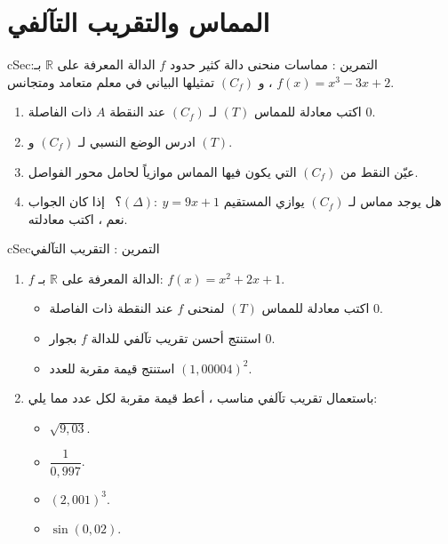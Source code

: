 \documentclass[12pt,a4paper]{article}
\newenvironment{BOX}[2]{\begin{otherlanguage}{english}\begin{arbox}{#1}{#2}}{\end{arbox}\end{otherlanguage}}
\newcounter{exo}
\newenvironment{tamrin}[1]{\stepcounter{exo}\begin{BOX}{cSec}{التمرين \theexo: #1}}{\end{BOX}}
\newcommand{\R}{\mathbb{R}}
\newenvironment{sq}{\begin{itemize}[leftmargin=2.4em,itemsep=3pt]}{\end{itemize}}
\newcommand{\qa}{\item[(أ)]}\newcommand{\qb}{\item[(ب)]}\newcommand{\qc}{\item[(جـ)]}\newcommand{\qd}{\item[(د)]}\newcommand{\qe}{\item[(هـ)]}
\begin{document}
\section{المماس والتقريب التآلفي}
\begin{tamrin}{مماسات منحنى دالة كثير حدود}
$f$ الدالة المعرفة على $\R$ بـ: $f(x)=x^3-3x+2$ ، و $(C_f)$ تمثيلها البياني في معلم متعامد ومتجانس.
\begin{enumerate}
\item اكتب معادلة للمماس $(T)$ لـ $(C_f)$ عند النقطة $A$ ذات الفاصلة $0$.
\item ادرس الوضع النسبي لـ $(C_f)$ و $(T)$.
\item عيّن النقط من $(C_f)$ التي يكون فيها المماس موازياً لحامل محور الفواصل.
\item هل يوجد مماس لـ $(C_f)$ يوازي المستقيم $(\Delta):\ y=9x+1$؟ \ إذا كان الجواب نعم ، اكتب معادلته.
\end{enumerate}
\end{tamrin}

\begin{tamrin}{التقريب التآلفي}
\begin{enumerate}
\item $f$ الدالة المعرفة على $\R$ بـ: $f(x)=x^2+2x+1$.
\begin{sq}
\qa اكتب معادلة للمماس $(T)$ لمنحنى $f$ عند النقطة ذات الفاصلة $0$.
\qb استنتج أحسن تقريب تآلفي للدالة $f$ بجوار $0$.
\qc استنتج قيمة مقربة للعدد $(1{,}00004)^2$.
\end{sq}
\item باستعمال تقريب تآلفي مناسب ، أعط قيمة مقربة لكل عدد مما يلي:
\begin{sq}
\qa $\sqrt{9{,}03}$.
\qb $\dfrac{1}{0{,}997}$.
\qc $(2{,}001)^3$.
\qd $\sin(0{,}02)$.
\end{sq}
\end{enumerate}
\end{tamrin}
\end{document}
